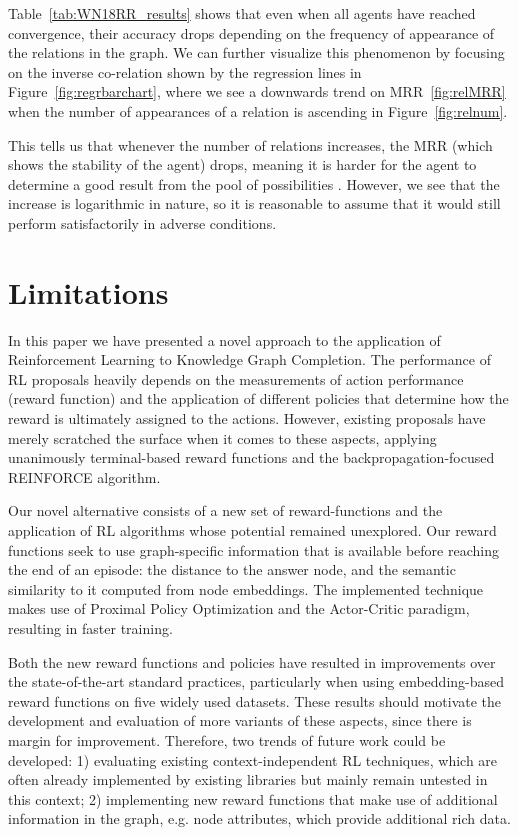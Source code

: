 Table~\ref{tab:WN18RR_results} shows that even when all agents have reached convergence, their accuracy drops depending on the frequency of appearance of the relations in the graph. We can further visualize this phenomenon by focusing on the inverse co-relation shown by the regression lines in Figure~\ref{fig:regrbarchart}, where we see a downwards trend on MRR~\ref{fig:relMRR} when the number of appearances of a relation is ascending in Figure~\ref{fig:relnum}.

This tells us that whenever the number of relations increases, the MRR (which shows the stability of the agent) drops, meaning it is harder for the agent to determine a good result from the pool of possibilities . However, we see that the increase is logarithmic in nature, so it is reasonable to assume that it would still perform satisfactorily in adverse conditions.


\section{Limitations}\label{sec:spacerl-limitations}


In this paper we have presented a novel approach to the application of Reinforcement Learning to Knowledge Graph Completion. The performance of RL proposals heavily depends on the measurements of action performance (reward function) and the application of different policies that determine how the reward is ultimately assigned to the actions. However, existing proposals have merely scratched the surface when it comes to these aspects, applying unanimously terminal-based reward functions and the backpropagation-focused REINFORCE algorithm.

Our novel alternative consists of a new set of reward-functions and the application of RL algorithms whose potential remained unexplored. Our reward functions seek to use graph-specific information that is available before reaching the end of an episode: the distance to the answer node, and the semantic similarity to it computed from node embeddings. The implemented technique makes use of Proximal Policy Optimization and the Actor-Critic paradigm, resulting in faster training.

Both the new reward functions and policies have resulted in improvements over the state-of-the-art standard practices, particularly when using embedding-based reward functions on five widely used datasets. These results should motivate the development and evaluation of more variants of these aspects, since there is margin for improvement. Therefore, two trends of future work could be developed: 1) evaluating existing context-independent RL techniques, which are often already implemented by existing libraries but mainly remain untested in this context; 2) implementing new reward functions that make use of additional information in the graph, e.g. node attributes, which provide additional rich data.

